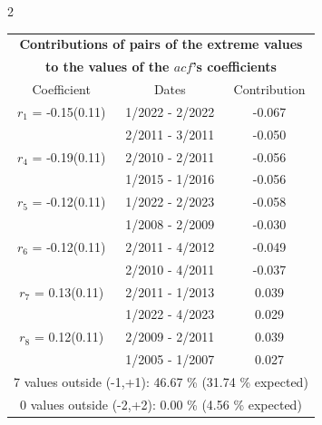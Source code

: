 
\thispagestyle{empty}
\begin{multicols}{2}{ 
\begin{tabular}{ccc}
\multicolumn{3}{c}{\textbf{Contributions of pairs of the extreme values} }  \vspace{-.10in}  \\ 
\multicolumn{3}{c}{ \textbf{to the values of the $acf$'s coefficients}} \\ 
\hline 
\hline                  Coefficient  &  Dates &  Contribution \\ 
\hline 
  $r_{ 1}$ = -0.15(0.11) &       1/2022 -  2/2022 &       -0.067    \vspace{-.10in} \\ 
  &        2/2011 -  3/2011 &       -0.050  \vspace{-.02in}   \\ \hline 
    $r_{ 4}$ = -0.19(0.11) &       2/2010 -  2/2011 &       -0.056    \vspace{-.10in} \\ 
  &        1/2015 -  1/2016 &       -0.056  \vspace{-.02in}   \\ \hline 
    $r_{ 5}$ = -0.12(0.11) &       1/2022 -  2/2023 &       -0.058    \vspace{-.10in} \\ 
  &        1/2008 -  2/2009 &       -0.030  \vspace{-.02in}   \\ \hline 
    $r_{ 6}$ = -0.12(0.11) &       2/2011 -  4/2012 &       -0.049    \vspace{-.10in} \\ 
  &        2/2010 -  4/2011 &       -0.037  \vspace{-.02in}   \\ \hline 
    $r_{ 7}$ = 0.13(0.11) &       2/2011 -  1/2013 &        0.039   \vspace{-.10in} \\  
&        1/2022 -  4/2023 &        0.029  \vspace{-.02in} \\ \hline 
  $r_{ 8}$ = 0.12(0.11) &       2/2009 -  2/2011 &        0.039   \vspace{-.10in} \\  
&        1/2005 -  1/2007 &        0.027  \vspace{-.02in} \\ \hline 
\multicolumn{3}{c}{               7 values outside (-1,+1): 46.67  \% (31.74  \% expected)}\vspace{-.10in} \\ 
\multicolumn{3}{c}{               0 values outside (-2,+2):  0.00 \%  (4.56 \% expected) } \\
 \end{tabular} \\ 
 } 
\end{multicols} 
